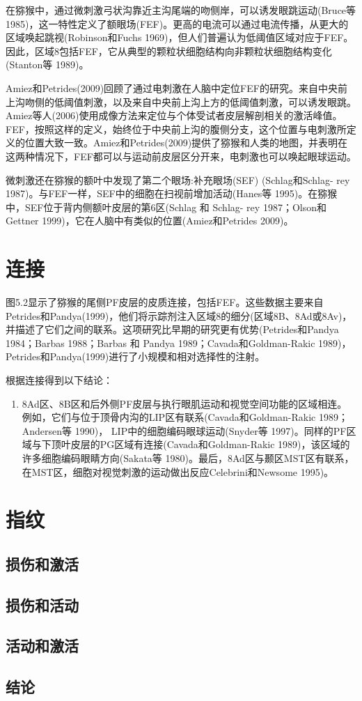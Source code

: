 在猕猴中，通过微刺激弓状沟靠近主沟尾端的吻侧岸，可以诱发眼跳运动(Bruce等 1985)，这一特性定义了额眼场(FEF)。更高的电流可以通过电流传播，从更大的区域唤起跳视(Robinson和Fuchs 1969)，但人们普遍认为低阈值区域对应于FEF。因此，区域8包括FEF，它从典型的颗粒状细胞结构向非颗粒状细胞结构变化(Stanton等 1989)。

Amiez和Petrides(2009)回顾了通过电刺激在人脑中定位FEF的研究。来自中央前上沟吻侧的低阈值刺激，以及来自中央前上沟上方的低阈值刺激，可以诱发眼跳。Amiez等人(2006)使用成像方法来定位与个体受试者皮层解剖相关的激活峰值。FEF，按照这样的定义，始终位于中央前上沟的腹侧分支，这个位置与电刺激所定义的位置大致一致。Amiez和Petrides(2009)提供了猕猴和人类的地图，并表明在这两种情况下，FEF都可以与运动前皮层区分开来，电刺激也可以唤起眼球运动。

微刺激还在猕猴的额叶中发现了第二个眼场:补充眼场(SEF) (Schlag和Schlag- rey 1987)。与FEF一样，SEF中的细胞在扫视前增加活动(Hanes等 1995)。在猕猴中，SEF位于背内侧额叶皮层的第6区(Schlag 和 Schlag- rey 1987；Olson和Gettner 1999)，它在人脑中有类似的位置(Amiez和Petrides 2009)。
\section{连接}
图5.2显示了猕猴的尾侧PF皮层的皮质连接，包括FEF。这些数据主要来自Petrides和Pandya(1999)，他们将示踪剂注入区域8的细分(区域8B、8Ad或8Av)，并描述了它们之间的联系。这项研究比早期的研究更有优势(Petrides和Pandya 1984；Barbas 1988；Barbas 和 Pandya 1989；Cavada和Goldman-Rakic 1989)， Petrides和Pandya(1999)进行了小规模和相对选择性的注射。


根据连接得到以下结论：

\begin{enumerate}
	\item 8Ad区、8B区和后外侧PF皮层与执行眼肌运动和视觉空间功能的区域相连。例如，它们与位于顶骨内沟的LIP区有联系(Cavada和Goldman-Rakic 1989；Andersen等 1990)， LIP中的细胞编码眼球运动(Snyder等 1997)。同样的PF区域与下顶叶皮层的PG区域有连接(Cavada和Goldman-Rakic 1989)，该区域的许多细胞编码眼睛方向(Sakata等 1980)。最后，8Ad区与颞区MST区有联系，在MST区，细胞对视觉刺激的运动做出反应Celebrini和Newsome 1995)。
\end{enumerate}

\section{指纹}

\subsection{损伤和激活}

\subsection{损伤和活动}

\subsection{活动和激活}



\subsection{结论}